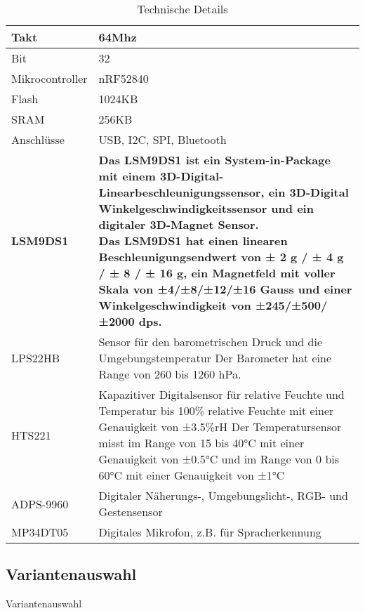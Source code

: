 \begin{table}[H]
  \centering
  \settowidth{}
  \setlength\extrarowheight{2pt}
  \begin{tabulary}{1.0\textwidth}{|L|L|}
    \hline
    Takt &
    64Mhz\\
    \hline
    Bit & 32 \\
    \hline
    Mikrocontroller& nRF52840 \\
    \hline
    Flash & 1024KB \\
    \hline
    SRAM&  256KB\\
    \hline
    Anschlüsse& USB, I2C, SPI, Bluetooth \\
    \hline
    \textbf{LSM9DS1}& \textbf{Das LSM9DS1 ist ein System-in-Package mit einem 3D-Digital-Linearbeschleunigungssensor, ein 3D-Digital Winkelgeschwindigkeitssensor und ein digitaler 3D-Magnet Sensor.\newline
    Das LSM9DS1 hat einen linearen Beschleunigungsendwert von ± 2 g / ± 4 g / ± 8 / ± 16 g, ein Magnetfeld mit voller Skala von ±4/±8/±12/±16 Gauss und einer Winkelgeschwindigkeit von ±245/±500/±2000 dps.
    } \\
    \hline
    LPS22HB& Sensor für den barometrischen Druck und die Umgebungstemperatur\newline
    Der Barometer hat eine Range von 260 bis 1260 hPa. 
     \\
    \hline
    HTS221 & Kapazitiver Digitalsensor für relative Feuchte und Temperatur bis 100\% relative Feuchte mit einer Genauigkeit von ±3.5\%rH\newline
    Der Temperatursensor misst im Range von 15 bis 40°C mit einer Genauigkeit von ±0.5°C und im Range von 0 bis 60°C mit einer Genauigkeit von ±1°C 
     \\
    \hline
    ADPS-9960& Digitaler Näherungs-, Umgebungslicht-, RGB- und Gestensensor \\
    \hline
    MP34DT05& Digitales Mikrofon, z.B. für Spracherkennung \\
    \hline
  \end{tabulary}
  \caption{Technische Details}
\end{table}


\subsection{Variantenauswahl}
Variantenauswahl

\newpage